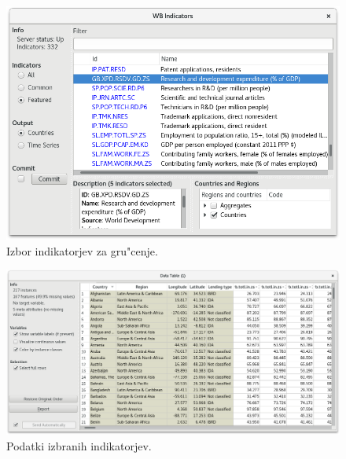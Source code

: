 \begin{figure}
\begin{center}
\includegraphics[width=13.75cm]{pic/clustering_indicator_selection.png}
\end{center}
\caption{Izbor indikatorjev za gru"cenje.}
\label{clustering_indicator_selection}
\end{figure} 

\begin{figure}
\begin{center}
\includegraphics[width=13.75cm]{pic/clustering_data.png}
\end{center}
\caption{Podatki izbranih indikatorjev.}
\label{clustering_data}
\end{figure} 

